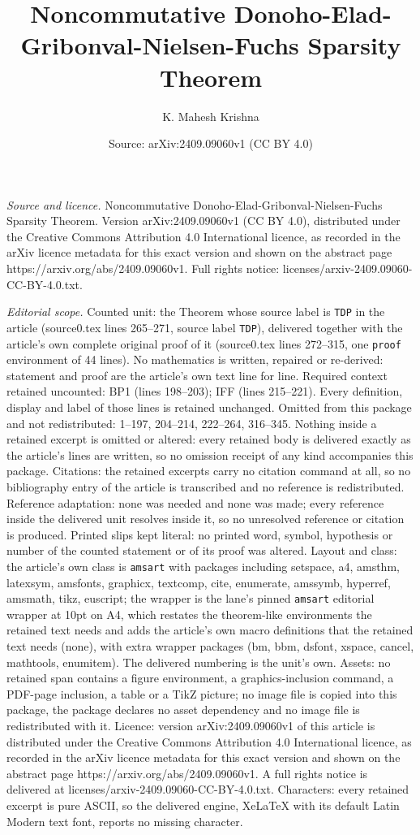 \documentclass[10pt,a4paper]{amsart}
\title[Noncommutative Donoho-Elad-Gribonval-Nielsen-Fuchs Sparsity ]{Noncommutative Donoho-Elad-Gribonval-Nielsen-Fuchs Sparsity Theorem}
\author{K. Mahesh Krishna}
\date{Source: arXiv:2409.09060v1 (CC BY 4.0)}
\begin{document}
\maketitle

\noindent\emph{Source and licence.} Noncommutative Donoho-Elad-Gribonval-Nielsen-Fuchs Sparsity Theorem. Version arXiv:2409.09060v1 (CC BY 4.0), distributed under the Creative Commons Attribution 4.0 International licence, as recorded in the arXiv licence metadata for this exact version and shown on the abstract page https://arxiv.org/abs/2409.09060v1. Full rights notice: licenses/arxiv-2409.09060-CC-BY-4.0.txt.\par\smallskip

\noindent\textit{Editorial scope.} Counted unit: the Theorem whose source label is \texttt{TDP} in the article (source0.tex lines 265--271, source label \texttt{TDP}), delivered together with the article's own complete original proof of it (source0.tex lines 272--315, one \texttt{proof} environment of 44 lines). No mathematics is written, repaired or re-derived: statement and proof are the article's own text line for line. Required context retained uncounted: BP1 (lines 198--203); IFF (lines 215--221). Every definition, display and label of those lines is retained unchanged. Omitted from this package and not redistributed: 1--197, 204--214, 222--264, 316--345. Nothing inside a retained excerpt is omitted or altered: every retained body is delivered exactly as the article's lines are written, so no omission receipt of any kind accompanies this package. Citations: the retained excerpts carry no citation command at all, so no bibliography entry of the article is transcribed and no reference is redistributed. Reference adaptation: none was needed and none was made; every reference inside the delivered unit resolves inside it, so no unresolved reference or citation is produced. Printed slips kept literal: no printed word, symbol, hypothesis or number of the counted statement or of its proof was altered. Layout and class: the article's own class is \texttt{amsart} with packages including setspace, a4, amsthm, latexsym, amsfonts, graphicx, textcomp, cite, enumerate, amssymb, hyperref, amsmath, tikz, euscript; the wrapper is the lane's pinned \texttt{amsart} editorial wrapper at 10pt on A4, which restates the theorem-like environments the retained text needs and adds the article's own macro definitions that the retained text needs (none), with extra wrapper packages (bm, bbm, dsfont, xspace, cancel, mathtools, enumitem). The delivered numbering is the unit's own. Assets: no retained span contains a figure environment, a graphics-inclusion command, a PDF-page inclusion, a table or a TikZ picture; no image file is copied into this package, the package declares no asset dependency and no image file is redistributed with it. Licence: version arXiv:2409.09060v1 of this article is distributed under the Creative Commons Attribution 4.0 International licence, as recorded in the arXiv licence metadata for this exact version and shown on the abstract page https://arxiv.org/abs/2409.09060v1. A full rights notice is delivered at licenses/arxiv-2409.09060-CC-BY-4.0.txt. Characters: every retained excerpt is pure ASCII, so the delivered engine, XeLaTeX with its default Latin Modern text font, reports no missing character.
\end{document}

